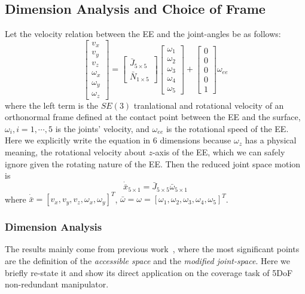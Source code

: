 \documentclass[Afour,sageh,times]{sagej}
\begin{document}
\subsection{Dimension Analysis and Choice of Frame}
Let the velocity relation between the EE and the joint-angles be as follows: 
\begin{equation}\label{equ_total}
\left[
\begin{matrix}
v_x\\
v_y\\
v_z\\
\omega_x\\
\omega_y\\
\omega_z
\end{matrix}
\right]= \left[
\begin{matrix}
\bar{J}_{5\times 5}\\
\bar{N}_{1\times 5}
\end{matrix}
\right]\left[
\begin{matrix}
\omega_1\\
\omega_2\\
\omega_3\\
\omega_4\\
\omega_5
\end{matrix}
\right] + \left[
\begin{matrix}
0\\
0\\
0\\
0\\
1
\end{matrix}
\right]
\omega_{ee}
\end{equation}
where the left term is the $SE(3)$ tranlational and rotational velocity of an orthonormal frame defined at the contact point between the EE and the surface, $\omega_i, i = 1, \cdots, 5$ is the joints' velocity, and $\omega_{ee}$ is the rotational speed of the EE. Here we explicitly write the equation in $6$ dimensions because $\omega_z$ has a physical meaning, the rotational velocity about $z$-axis of the EE, which we can safely ignore given the rotating nature of the EE. Then the reduced joint space motion is 
\begin{equation}
\dot{\bar{x}}_{5\times 1} = \bar{J}_{5\times 5}\bar{\omega}_{5\times 1}
\end{equation}
where $\dot{\bar{x}} = \left[ v_x, v_y, v_z, \omega_x, \omega_y \right]^T$, $\bar{\omega} = \omega = \left[ \omega_1, \omega_2, \omega_3, \omega_4, \omega_5 \right]^T$.

\subsubsection{Dimension Analysis}
The results mainly come from previous work~\cite{Singh1993Motion}, where the most significant points are the definition of the \textit{accessible space} and the \textit{modified joint-space}. Here we briefly re-state it and show its direct application on the coverage task of 5DoF non-redundant manipulator. 
\end{document}
